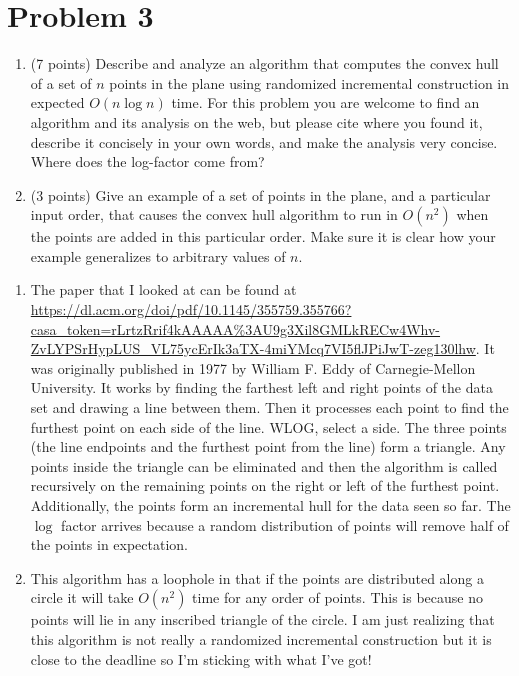 \documentclass[11pt]{article}
\begin{document}
\newpage
\section*{Problem 3}

\begin{enumerate}

    \item (7 points) Describe and analyze an algorithm that computes the
        convex hull of a set of $n$ points in the plane using randomized
        incremental construction in expected $O(n \log n)$ time. For this
        problem you are welcome to find an algorithm and its analysis on the
        web, but please cite where you found it, describe it concisely in
        your own words, and make the analysis very concise. Where does the
        log-factor come from?

    \item (3 points) Give an example of a set of points in the plane, and a
        particular input order, that causes the convex hull algorithm to run in
        $O(n^2)$ when the points are added in this particular order. Make sure it
        is clear how your example generalizes to arbitrary values of $n$.

\end{enumerate}
\answer
\begin{enumerate}
    \item The paper that I looked at can be found at
    \url{https://dl.acm.org/doi/pdf/10.1145/355759.355766?casa_token=rLrtzRrif4kAAAAA%3AU9g3Xil8GMLkRECw4Whv-ZvLYPSrHypLUS_VL75ycErIk3aTX-4miYMcq7VI5flJPiJwT-zeg130lhw}.
    It was originally published in 1977 by William F. Eddy of Carnegie-Mellon University.
    It works by finding the farthest left and right points of the data set and drawing a line between them.
    Then it processes each point to find the furthest point on each side of the line.
    WLOG, select a side.
    The three points (the line endpoints and the furthest point from the line) form a triangle.
    Any points inside the triangle can be eliminated and then the algorithm is called recursively on the remaining points on the right or left of the furthest point.
    Additionally, the points form an incremental hull for the data seen so far.
    The $\log$ factor arrives because a random distribution of points will remove half of the points in expectation.

    \item This algorithm has a loophole in that if the points are distributed along a circle it will take $O(n^2)$ time for any order of points.
    This is because no points will lie in any inscribed triangle of the circle.
    I am just realizing that this algorithm is not really a randomized incremental construction but it is close to the deadline so I'm sticking with what I've got!
\end{enumerate}
\end{document}
